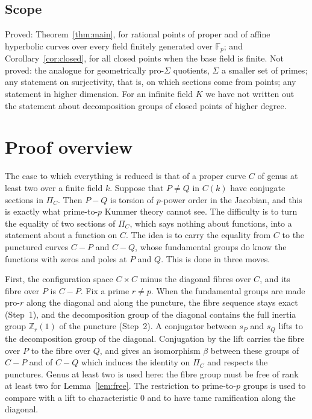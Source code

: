 \documentclass[11pt]{amsart}
\theoremstyle{remark}
\newcommand{\Z}{\mathbb Z}
\newcommand{\F}{\mathbb F}
\begin{document}
\subsection{Scope}
Proved: Theorem~\ref{thm:main}, for rational points of proper and of affine hyperbolic curves over every field finitely generated over $\F_p$; and Corollary~\ref{cor:closed}, for all closed points when the base field is finite. Not proved: the analogue for geometrically pro-$\Sigma$ quotients, $\Sigma$ a smaller set of primes; any statement on surjectivity, that is, on which sections come from points; any statement in higher dimension. For an infinite field $K$ we have not written out the statement about decomposition groups of closed points of higher degree.

\section{Proof overview}

The case to which everything is reduced is that of a proper curve $C$ of genus at least two over a finite field $k$. Suppose that $P\ne Q$ in $C(k)$ have conjugate sections in $\Pi_C$. Then $P-Q$ is torsion of $p$-power order in the Jacobian, and this is exactly what prime-to-$p$ Kummer theory cannot see. The difficulty is to turn the equality of two sections of $\Pi_C$, which says nothing about functions, into a statement about a function on $C$. The idea is to carry the equality from $C$ to the punctured curves $C-P$ and $C-Q$, whose fundamental groups do know the functions with zeros and poles at $P$ and $Q$. This is done in three moves.

First, the configuration space $C\times C$ minus the diagonal fibres over $C$, and its fibre over $P$ is $C-P$. Fix a prime $r\ne p$. When the fundamental groups are made pro-$r$ along the diagonal and along the puncture, the fibre sequence stays exact (Step~1), and the decomposition group of the diagonal contains the full inertia group $\Z_r(1)$ of the puncture (Step~2). A conjugator between $s_P$ and $s_Q$ lifts to the decomposition group of the diagonal. Conjugation by the lift carries the fibre over $P$ to the fibre over $Q$, and gives an isomorphism $\beta$ between these groups of $C-P$ and of $C-Q$ which induces the identity on $\Pi_C$ and respects the punctures. Genus at least two is used here: the fibre group must be free of rank at least two for Lemma~\ref{lem:free}. The restriction to prime-to-$p$ groups is used to compare with a lift to characteristic $0$ and to have tame ramification along the diagonal.
\end{document}

